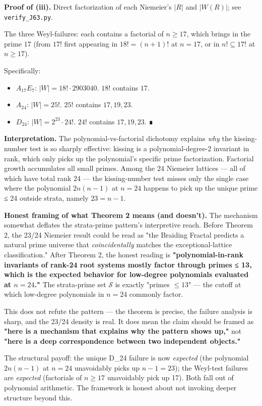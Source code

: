 \documentclass[11pt,reqno]{amsart}
\theoremstyle{plain}
\theoremstyle{definition}
\begin{document}
\textbf{Proof of (iii).} Direct factorization of each Niemeier's $|R|$ and $|W(R)|$; see \texttt{verify_J63.py}.

The three Weyl-failures: each contains a factorial of $n \geq 17$, which brings in the prime $17$ (from $17!$ first appearing in $18! = (n+1)!$ at $n=17$, or in $n! \subseteq 17!$ at $n \geq 17$).

Specifically:
\begin{itemize}
\item $A_{17}E_7$: $|W| = 18! \cdot 2903040$. $18!$ contains $17$.
\item $A_{24}$: $|W| = 25!$. $25!$ contains $17, 19, 23$.
\item $D_{24}$: $|W| = 2^{23} \cdot 24!$. $24!$ contains $17, 19, 23$. ∎
\end{itemize}

\textbf{Interpretation.} The polynomial-vs-factorial dichotomy explains \textit{why} the kissing-number test is so sharply effective: kissing is a polynomial-degree-2 invariant in rank, which only picks up the polynomial's specific prime factorization. Factorial growth accumulates all small primes. Among the 24 Niemeier lattices --- all of which have total rank 24 --- the kissing-number test misses only the single case where the polynomial $2n(n-1)$ at $n=24$ happens to pick up the unique prime ≤ 24 outside strata, namely $23 = n - 1$.

\textbf{Honest framing of what Theorem 2 means (and doesn't).} The mechanism somewhat deflates the strata-prime pattern's interpretive reach. Before Theorem 2, the 23/24 Niemeier result could be read as "the Braiding Fractal predicts a natural prime universe that \textit{coincidentally} matches the exceptional-lattice classification." After Theorem 2, the honest reading is \textbf{"polynomial-in-rank invariants of rank-24 root systems mostly factor through primes ≤ 13, which is the expected behavior for low-degree polynomials evaluated at $n = 24$."} The strata-prime set $\mathcal{S}$ is exactly "primes $\leq 13$" --- the cutoff at which low-degree polynomials in $n = 24$ commonly factor.

This does not refute the pattern --- the theorem is precise, the failure analysis is sharp, and the 23/24 density is real. It does mean the claim should be framed as \textbf{"here is a mechanism that explains why the pattern shows up,"} not \textbf{"here is a deep correspondence between two independent objects."}

The structural payoff: the unique D_24 failure is now \textit{expected} (the polynomial $2n(n-1)$ at $n = 24$ unavoidably picks up $n - 1 = 23$); the Weyl-test failures are \textit{expected} (factorials of $n \geq 17$ unavoidably pick up 17). Both fall out of polynomial arithmetic. The framework is honest about not invoking deeper structure beyond this.
\end{document}
